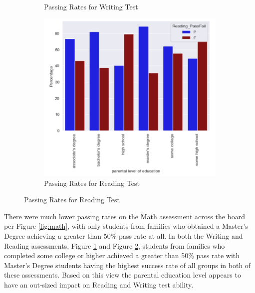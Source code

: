 \documentclass[man,floatsintext]{apa6} %
\begin{document}
\begin{figure}[H]
\begin{subfigure}[b]{0.28\textwidth}
    \caption{Passing Rates for Writing Test}
    \label{fig:write}
    \end{subfigure}
    \begin{subfigure}[b]{0.28\textwidth}
    \includegraphics[width=\linewidth]{ReadingPFBarGraph.png}
    \caption{Passing Rates for Reading Test}
    \label{fig:read}
    \end{subfigure}
    \label{fig:PassRatesParentEdLevel}
\end{figure}

There were much lower passing rates on the Math assessment across the board per Figure \ref{fig:math}, with only students from families who obtained a Master's Degree achieving a greater than 50\% pass rate at all. In both the Writing and Reading assessments, Figure \ref{fig:write} and Figure \ref{fig:read}, students from families who completed some college or higher achieved a greater than 50\% pass rate with Master's Degree students having the highest success rate of all groups in both of these assessments. Based on this view the parental education level appears to have an out-sized impact on Reading and Writing test ability.
\end{document}
